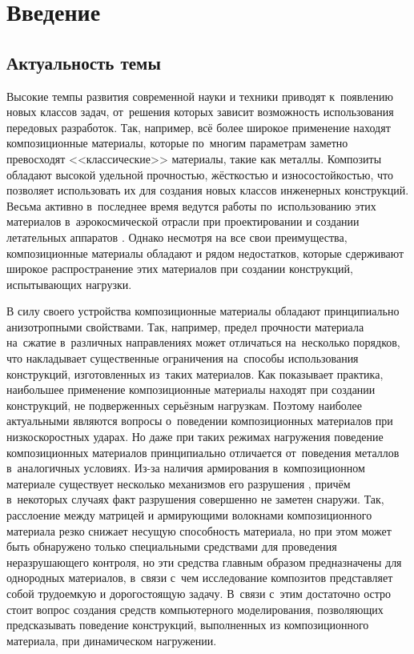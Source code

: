 \documentclass[thesis.tex]{subfiles}
\begin{document}
\section*{Введение}

\subsection*{Актуальность темы}

Высокие темпы развития современной науки и техники приводят к~появлению новых классов задач, от~решения которых зависит
возможность использования передовых разработок. Так, например, всё более широкое применение находят композиционные
материалы, которые по~многим параметрам заметно превосходят \cite{кербер2011полимерные} <<классические>> материалы,
такие как металлы. Композиты обладают \cite{миллс2011конструкционные,баженов2010полимерные} высокой удельной прочностью,
жёсткостью и износостойкостью, что позволяет использовать их для создания новых классов инженерных конструкций. Весьма
активно в~последнее время ведутся работы по~использованию этих материалов в~аэрокосмической отрасли при проектировании и
создании летательных аппаратов \cite{linde2006influence,буланов1998технология,flower2003materials}. Однако несмотря на
все свои преимущества, композиционные материалы обладают и рядом недостатков, которые сдерживают широкое распространение
этих материалов при создании конструкций, испытывающих нагрузки.

В силу своего устройства композиционные материалы обладают принципиально анизотропными свойствами. Так, например, предел
прочности материала на~сжатие в~различных направлениях может отличаться \cite{васильев1988механика} на~несколько
порядков, что накладывает существенные ограничения на~способы использования конструкций, изготовленных из~таких
материалов. Как показывает практика, наибольшее применение композиционные материалы находят при создании конструкций, не
подверженных серьёзным нагрузкам. Поэтому наиболее актуальными являются вопросы о~поведении композиционных материалов
при низкоскоростных ударах. Но даже при таких режимах нагружения поведение композиционных материалов принципиально
отличается от~поведения металлов в~аналогичных условиях. Из-за наличия армирования в~композиционном материале существует
несколько механизмов его разрушения \cite{richardson1996review}, причём в~некоторых случаях факт разрушения совершенно
не заметен снаружи. Так, расслоение между матрицей и армирующими волокнами композиционного материала резко снижает
несущую способность материала, но при этом может быть обнаружено только специальными средствами для проведения
неразрушающего контроля,  но эти средства главным образом предназначены для однородных материалов, в~связи с~чем
исследование композитов представляет собой трудоемкую и дорогостоящую задачу. В~связи с~этим достаточно остро стоит
вопрос создания средств компьютерного моделирования, позволяющих предсказывать поведение конструкций, выполненных из
композиционного материала, при динамическом нагружении.
\end{document}
